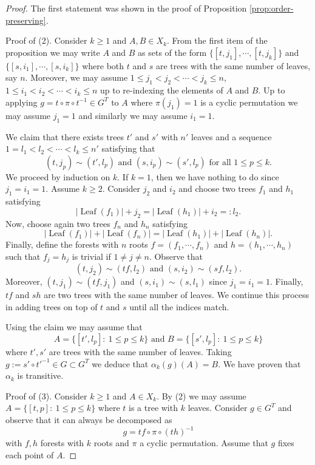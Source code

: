 \documentclass[a4paper, 12pt]{amsart}
\numberwithin{equation}{section}
\theoremstyle{definition}
\newcommand{\al}{\alpha}
\DeclareMathOperator{\Leaf}{Leaf}
\begin{document}
\begin{proof}
The first statement was shown in the proof of Proposition \ref{prop:order-preserving}.

Proof of (2).
Consider $k\geq 1$ and $A,B\in X_k$.
From the first item of the proposition we may write $A$ and $B$ as sets of the form $\{[t,j_1],\cdots,[t,j_k]\}$ and $\{[s,i_1],\cdots, [s,i_k]\}$ where both $t$ and $s$ are trees with the same number of leaves, say $n$.
Moreover, we may assume $1\leq j_1<j_2<\cdots<j_k\leq n$, $1\leq i_1<i_2<\cdots<i_k\leq n$ up to re-indexing the elements of $A$ and $B$.
Up to applying $g=t\circ \pi \circ t^{-1}\in G^T$ to $A$ where $\pi(j_1)=1$ is a cyclic permutation we may assume $j_1=1$ and similarly we may assume $i_1=1$.

We claim that there exists trees $t'$ and $s'$ with $n'$ leaves and a sequence $1=l_1<l_2<\cdots<l_k \leq n'$ satisfying that 
$$(t,j_p)\sim (t', l_p) \text{ and } (s,i_p)\sim (s',l_p) \text{ for all } 1\leq p\leq k.$$
We proceed by induction on $k$.
If $k=1$, then we have nothing to do since $j_1=i_1=1.$
Assume $k\geq 2.$
Consider $j_2$ and $i_2$ and choose two trees $f_1$ and $h_1$ satisfying
$$|\Leaf(f_1)| + j_2 = |\Leaf(h_1)|+i_2=:l_2.$$
Now, choose again two trees $f_n$ and $h_n$ satisfying
$$|\Leaf(f_1)|+|\Leaf(f_n)|=|\Leaf(h_1)| + |\Leaf(h_n)|.$$
Finally, define the forests with $n$ roots $f=(f_1,\cdots,f_n)$ and $h=(h_1,\cdots,h_n)$ such that $f_j=h_j$ is trivial if $1\neq j\neq n$.
Observe that 
$$(t,j_2)\sim (tf, l_2) \text{ and } (s,i_2)\sim (sf,l_2).$$
Moreover, $(t,j_1)\sim (tf,j_1)$ and $(s,i_1)\sim (s,l_1)$ since $j_1=i_1=1$.
Finally, $tf$ and $sh$ are two trees with the same number of leaves.
We continue this process in adding trees on top of $t$ and $s$ until all the indices match.

Using the claim we may assume that 
$$A=\{ [t',l_p]:\ 1\leq p\leq k\} \text{ and } B=\{[s',l_p]:\ 1\leq p\leq k\}$$
where $t',s'$ are trees with the same number of leaves.
Taking $g:=s'\circ t'^{-1}\in G\subset G^T$ we deduce that $\al_k(g)(A)=B.$
We have proven that $\al_k$ is transitive.

Proof of (3).
Consider $k\geq 1$ and $A\in X_k$.
By (2) we may assume $A=\{ [t, p]:\ 1\leq p\leq k\}$ where $t$ is a tree with $k$ leaves.
Consider $g\in G^T$ and observe that it can always be decomposed as
$$g= tf \circ \pi \circ (th)^{-1}$$
with $f,h$ forests with $k$ roots and $\pi$ a cyclic permutation.
Assume that $g$ fixes each point of $A$.


\end{proof}
\end{document}
